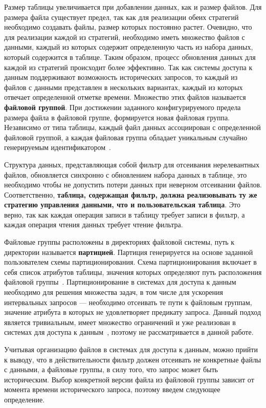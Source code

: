 Размер таблицы увеличивается при добавлении данных, как и размер файлов. Для размера файла существует предел, так как для реализации обеих стратегий необходимо создавать файлы, размер которых постоянно растет. Очевидно, что для реализации каждой из стратегий, необходимо иметь множество файлов с данными, каждый из которых содержит определенную часть из набора данных, который содержится в таблице. Таким образом, процесс обновления данных для каждой из стратегий происходит более эффективно. Так как системы доступа к данным поддерживают возможность исторических запросов, то каждый из файлов с данными представлен в нескольких вариантах, каждый из которых отвечает определенной отметке времени. Множество этих файлов называется \textbf{файловой группой}. При достижении заданного конфигурируемого предела размера файла в файловой группе, формируется новая файловая группа. Независимо от типа таблицы, каждый файл данных ассоциирован с определенной файловой группой, а каждая файловая группа обладает уникальным случайно генерируемым идентификатором~\cite{Hudi_File_layouts}.

Структура данных, представляющая собой фильтр для отсеивания нерелевантных файлов, обновляется синхронно с обновлением набора данных в таблице, это необходимо чтобы не допустить потери данных при неверном отсеивании файлов. Соответственно, \textbf{таблица, содержащая фильтр, должна реализовывать ту же стратегию управления данными, что и пользовательская таблица}. Это верно, так как каждая операция записи в таблицу требует записи в фильтр, а каждая операция чтения данных требует чтение фильтра.

Файловые группы расположены в директориях файловой системы, путь к директории называется \textbf{партицией}. Партиция генерируется на основе заданной пользователем схемы партиционирования. Схема партиционирования включает в себя список атрибутов таблицы, значения которых определяют путь расположения файловой группы~\cite{Hudi_File_layouts}. Партиционирование в системах для доступа к данным необходимо для решения множества задач, в том числе для ускорения интервальных запросов --- необходимо отсеивать те пути к файловым группам, значение атрибута в которых не удовлетворяет предикату запроса. Данный подход является тривиальным, имеет множество ограничений и уже реализован в системах для доступа к данным~\cite{Spatial_big_data_architecture}, поэтому не рассматривается в данной работе.

Учитывая организацию файлов в системах для доступа к данным, можно прийти к выводу, что в действительности фильтр должен отсеивать не конкретные файлы с данными, а файловые группы, в силу того, что запрос может быть историческим. Выбор конкретной версии файла из файловой группы зависит от момента времени исторического запроса, поэтому введем следующее определение.

